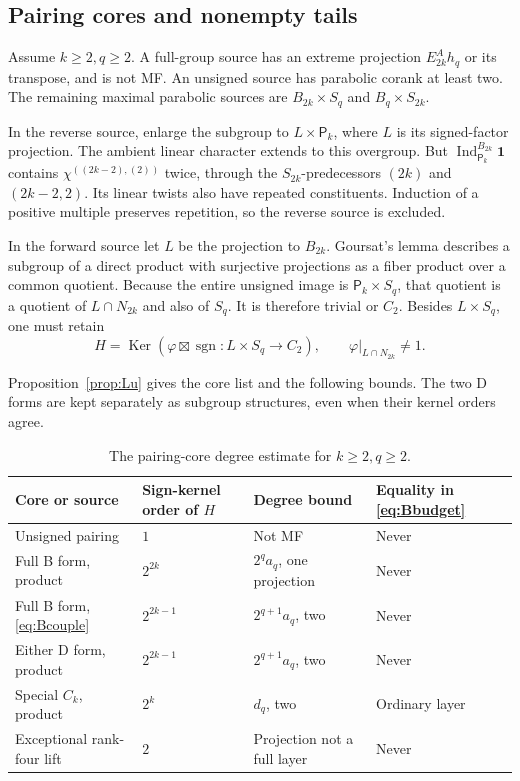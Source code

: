 \documentclass[11pt]{article}
\numberwithin{equation}{section}
\theoremstyle{definition}
\DeclareMathOperator{\Ind}{Ind}
\DeclareMathOperator{\sgn}{sgn}
\DeclareMathOperator{\Ker}{Ker}
\newcommand{\one}{\mathbf 1}
\newcommand{\pair}{\mathsf P}
\begin{document}
\subsection{Pairing cores and nonempty tails}

Assume \(k\geq2,q\geq2\).
A full-group source has an extreme projection \(E^A_{2k}h_q\) or its transpose, and is not MF.
An unsigned source has parabolic corank at least two.
The remaining maximal parabolic sources are \(B_{2k}\times S_q\) and \(B_q\times S_{2k}\).

In the reverse source, enlarge the subgroup to \(L\times\pair_k\), where \(L\) is its signed-factor projection.
The ambient linear character extends to this overgroup.
But \(\Ind_{\pair_k}^{B_{2k}}\one\) contains \(\chi^{((2k-2),(2))}\) twice, through the \(S_{2k}\)-predecessors \((2k)\) and \((2k-2,2)\).
Its linear twists also have repeated constituents.
Induction of a positive multiple preserves repetition, so the reverse source is excluded.

In the forward source let \(L\) be the projection to \(B_{2k}\).
Goursat's lemma describes a subgroup of a direct product with surjective projections as a fiber product over a common quotient.
Because the entire unsigned image is \(\pair_k\times S_q\), that quotient is a quotient of \(L\cap N_{2k}\) and also of \(S_q\).
It is therefore trivial or \(C_2\).
Besides \(L\times S_q\), one must retain
\begin{equation}
 H=\Ker(\varphi\boxtimes\sgn:L\times S_q\to C_2),
 \qquad \varphi|_{L\cap N_{2k}}\ne1 .
 \label{eq:Bcouple}
\end{equation}

Proposition~\ref{prop:Lu} gives the core list and the following bounds.
The two D forms are kept separately as subgroup structures, even when their kernel orders agree.
\begin{table}[htbp]
\centering\small
\setlength{\tabcolsep}{4pt}
\begin{tabular}{llll}
\toprule
Core or source&Sign-kernel order of \(H\)&Degree bound&Equality in \eqref{eq:Bbudget}\\
\midrule
Unsigned pairing&\(1\)&Not MF&Never\\
Full B form, product&\(2^{2k}\)&\(2^qa_q\), one projection&Never\\
Full B form, \eqref{eq:Bcouple}&\(2^{2k-1}\)&\(2^{q+1}a_q\), two&Never\\
Either D form, product&\(2^{2k-1}\)&\(2^{q+1}a_q\), two&Never\\
Special \(C_k\), product&\(2^k\)&\(d_q\), two&Ordinary layer\\
Exceptional rank-four lift&\(2\)&Projection not a full layer&Never\\
\bottomrule
\end{tabular}
\caption{The pairing-core degree estimate for \(k\geq2,q\geq2\).}
\label{tab:Bcore}
\end{table}
\end{document}
